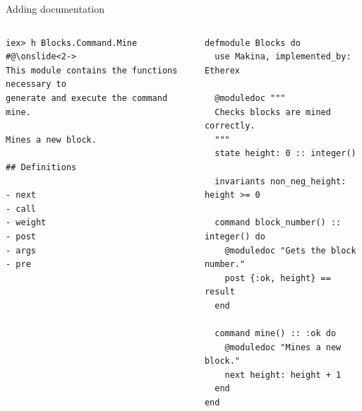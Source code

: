 \documentclass[aspectratio=169, 10pt, handout]{beamer}
\begin{document}
\begin{frame}[label={sec:orgef9d173},fragile]{Adding documentation}
 \begin{columns}
\begin{column}{0.48\columnwidth}
\lstset{language=bash,label= ,caption= ,captionpos=b,numbers=none,style=shell}
\begin{lstlisting}
iex> h Blocks.Command.Mine
#@\onslide<2->
This module contains the functions necessary to
generate and execute the command mine.

Mines a new block.

## Definitions

- next
- call
- weight
- post
- args
- pre
\end{lstlisting}
\end{column}
\begin{column}{0.48\columnwidth}
\lstset{language=elixir,label= ,caption= ,captionpos=b,numbers=none,style=display}
\begin{lstlisting}
defmodule Blocks do
  use Makina, implemented_by: Etherex

  @moduledoc """
  Checks blocks are mined correctly.
  """
  state height: 0 :: integer()

  invariants non_neg_height: height >= 0

  command block_number() :: integer() do
    @moduledoc "Gets the block number."
    post {:ok, height} == result
  end

  command mine() :: :ok do
    @moduledoc "Mines a new block."
    next height: height + 1
  end
end
\end{lstlisting}
\end{column}
\end{columns}
\end{frame}
\end{document}
